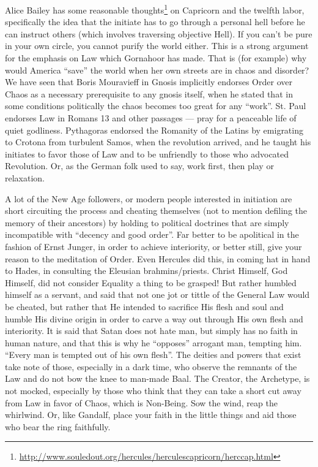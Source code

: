 Alice Bailey has some reasonable thoughts\footnote{\url{http://www.souledout.org/hercules/herculescapricorn/herccap.html}} on Capricorn and the twelfth labor, specifically the idea that the initiate has to go through a personal hell before he can instruct others (which involves traversing objective Hell). If you can't be pure in your own circle, you cannot purify the world either. This is a strong argument for the emphasis on Law which Gornahoor has made. That is (for example) why would America ``save'' the world when her own streets are in chaos and disorder? We have seen that Boris Mouravieff in Gnosis implicitly endorses Order over Chaos as a necessary prerequisite to any gnosis itself, when he stated that in some conditions politically the chaos becomes too great for any ``work''. St. Paul endorses Law in Romans 13 and other passages --- pray for a peaceable life of quiet godliness. Pythagoras endorsed the Romanity of the Latins by emigrating to Crotona from turbulent Samos, when the revolution arrived, and he taught his initiates to favor those of Law and to be unfriendly to those who advocated Revolution. Or, as the German folk used to say, work first, then play or relaxation.

A lot of the New Age followers, or modern people interested in initiation are short circuiting the process and cheating themselves (not to mention defiling the memory of their ancestors) by holding to political doctrines that are simply incompatible with ``decency and good order''. Far better to be apolitical in the fashion of Ernst Junger, in order to achieve interiority, or better still, give your reason to the meditation of Order. Even Hercules did this, in coming hat in hand to Hades, in consulting the Eleusian brahmins/priests. Christ Himself, God Himself, did not consider Equality a thing to be grasped! But rather humbled himself as a servant, and said that not one jot or tittle of the General Law would be cheated, but rather that He intended to sacrifice His flesh and soul and humble His divine origin in order to carve a way out through His own flesh and interiority. It is said that Satan does not hate man, but simply has no faith in human nature, and that this is why he ``opposes'' arrogant man, tempting him. ``Every man is tempted out of his own flesh''. The deities and powers that exist take note of those, especially in a dark time, who observe the remnants of the Law and do not bow the knee to man-made Baal. The Creator, the Archetype, is not mocked, especially by those who think that they can take a short cut away from Law in favor of Chaos, which is Non-Being. Sow the wind, reap the whirlwind. Or, like Gandalf, place your faith in the little things and aid those who bear the ring faithfully.

